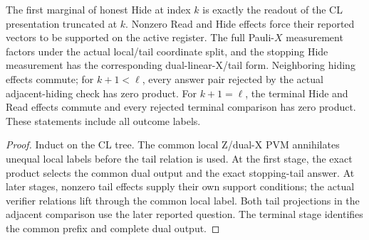 \begin{lemma}
\label{lem:intro-honest-hiding}
\leanok
The first marginal of honest Hide at index $k$ is exactly the readout of the
CL presentation truncated at $k$. Nonzero Read and Hide effects force their
reported vectors to be supported on the active register. The full Pauli-$X$
measurement factors under the actual local/tail coordinate split, and the
stopping Hide measurement has the corresponding dual-linear-X/tail form.
Neighboring hiding effects commute; for $k+1<\ell$, every answer pair rejected
by the actual adjacent-hiding check has zero product. For $k+1=\ell$, the
terminal Hide and Read effects commute and every rejected terminal comparison
has zero product. These statements include all outcome labels.
\end{lemma}
\begin{proof}
\leanok
Induct on the CL tree. The common local Z/dual-X PVM annihilates unequal local
labels before the tail relation is used. At the first stage, the exact product
selects the common dual output and the exact stopping-tail answer. At later
stages, nonzero tail effects supply their own support conditions; the actual
verifier relations lift through the common local label. Both tail projections
in the adjacent comparison use the later reported question. The terminal
stage identifies the common prefix and complete dual output.
\end{proof}

